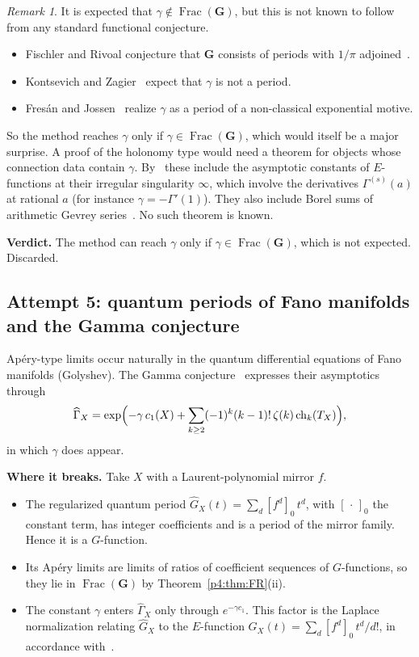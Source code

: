 \documentclass[11pt,a4paper]{article}
\theoremstyle{definition}
\theoremstyle{remark}
\newtheorem{remark}[theorem]{Remark}
\newcommand{\bG}{\mathbf G}
\DeclareMathOperator{\Frac}{Frac}
\numberwithin{equation}{section}
\begin{document}
\begin{remark}\label{p4:rem:expect}
It is expected that $\gamma\notin\Frac(\bG)$, but this is not known to follow from any standard functional conjecture.
\begin{itemize}[leftmargin=2em]
\item Fischler and Rivoal conjecture that $\bG$ consists of periods with $1/\pi$ adjoined~\cite{p4:FR14}.
\item Kontsevich and Zagier~\cite{p4:KZ} expect that $\gamma$ is not a period.
\item Fres\'an and Jossen~\cite{p4:FJ} realize $\gamma$ as a period of a non-classical exponential motive.
\end{itemize}
So the method reaches $\gamma$ only if $\gamma\in\Frac(\bG)$, which would itself be a major surprise. A proof of the holonomy type would need a theorem for objects whose connection data contain $\gamma$. By~\cite[Thm.~3]{p4:FR16} these include the asymptotic constants of $E$-functions at their irregular singularity $\infty$, which involve the derivatives $\Gamma^{(s)}(a)$ at rational $a$ (for instance $\gamma=-\Gamma'(1)$). They also include Borel sums of arithmetic Gevrey series~\cite{p4:FR18}. No such theorem is known.
\end{remark}

\noindent\textbf{Verdict.} The method can reach $\gamma$ only if $\gamma\in\Frac(\bG)$, which is not expected. Discarded.

\subsection{Attempt 5: quantum periods of Fano manifolds and the Gamma conjecture}

Ap\'ery-type limits occur naturally in the quantum differential equations of Fano manifolds (Golyshev). The Gamma conjecture~\cite{p4:GGI} expresses their asymptotics through
\[
\widehat\Gamma_X=\exp\Bigl(-\gamma\,c_1(X)+\sum_{k\ge2}(-1)^k(k-1)!\,\zeta(k)\,\mathrm{ch}_k(T_X)\Bigr),
\]
in which $\gamma$ does appear.

\noindent\textbf{Where it breaks.} Take $X$ with a Laurent-polynomial mirror $f$.
\begin{itemize}[leftmargin=2em]
\item The regularized quantum period $\widehat G_X(t)=\sum_d[f^d]_0\,t^d$, with $[\,\cdot\,]_0$ the constant term, has integer coefficients and is a period of the mirror family. Hence it is a $G$-function.
\item Its Ap\'ery limits are limits of ratios of coefficient sequences of $G$-functions, so they lie in $\Frac(\bG)$ by Theorem~\ref{p4:thm:FR}(ii).
\item The constant $\gamma$ enters $\widehat\Gamma_X$ only through $e^{-\gamma c_1}$. This factor is the Laplace normalization relating $\widehat G_X$ to the $E$-function $G_X(t)=\sum_d[f^d]_0\,t^d/d!$, in accordance with~\cite[Thm.~3]{p4:FR16}.
\end{itemize}
\end{document}
